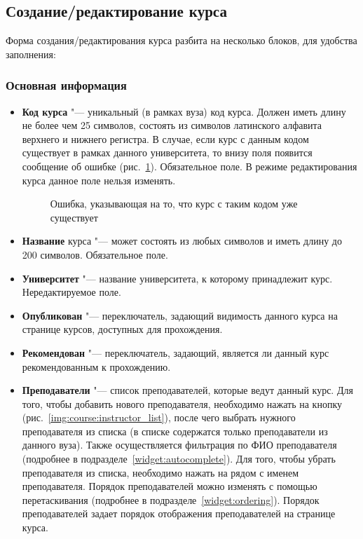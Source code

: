 \subsection{Создание/редактирование курса}
\label{course:subsec:course_create}
Форма создания/редактирования курса разбита на несколько блоков, для удобства заполнения:
\subsubsection{Основная информация}
	\begin{itemize}
		\item \textbf{Код курса} "--- уникальный (в рамках вуза) код курса. Должен иметь длину не более чем 25 символов, состоять из символов латинского алфавита верхнего и нижнего регистра. В случае, если курс с данным кодом существует в рамках данного университета, то внизу поля появится сообщение об ошибке (рис.~\ref{img:course:slug_error}). Обязательное поле. В режиме редактирования курса данное поле нельзя изменять.
		\begin{figure}[H]
			\caption{Ошибка, указывающая на то, что курс с таким кодом уже существует}
			\label{img:course:slug_error}
		\end{figure}
		\item \textbf{Название} курса "--- может состоять из любых символов и иметь длину до 200 символов. Обязательное поле.
		\item \textbf{Университет} "--- название университета, к которому принадлежит курс. Нередактируемое поле.
		\item \textbf{Опубликован} "--- переключатель, задающий видимость данного курса на странице курсов, доступных для прохождения.
		\item \textbf{Рекомендован} "--- переключатель, задающий, является ли данный курс рекомендованным к прохождению.
		\item \textbf{Преподаватели} "--- список преподавателей, которые ведут данный курс. Для того, чтобы добавить нового преподавателя, необходимо нажать на кнопку  (рис.~\ref{img:course:instructor_list}), после чего выбрать нужного преподавателя из списка (в списке содержатся только преподаватели из данного вуза). Также осуществляется фильтрация по ФИО преподавателя (подробнее в подразделе~\ref{widget:autocomplete}). Для того, чтобы убрать преподавателя из списка, необходимо нажать на  рядом с именем преподавателя. Порядок преподавателей можно изменять с помощью перетаскивания (подробнее в подразделе~\ref{widget:ordering}). Порядок преподавателей задает порядок отображения преподавателей на странице курса.

\end{itemize}
